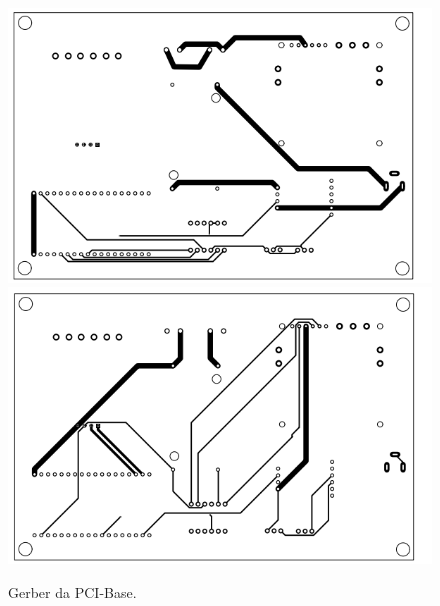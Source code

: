 \begin{figure}[H]
  \centering
  \includegraphics[scale=0.4]{Figuras/pci fabric/gerber base toplayer.png}
    \includegraphics[scale=0.4]{Figuras/pci fabric/gerber base bottom layer.png}
  \caption{Gerber da PCI-Base.}
  \label{fig:Gerber da PCI-Base}
\end{figure}

